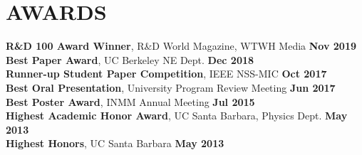 \section{\small{AWARDS}}

\textbf{R\&D 100 Award Winner}, R\&D World Magazine, WTWH Media \hfill \textbf{Nov 2019}\\
\textbf{Best Paper Award}, UC Berkeley NE Dept. \hfill \textbf{Dec 2018}\\
\textbf{Runner-up Student Paper Competition}, IEEE NSS-MIC \hfill \textbf{Oct 2017}\\
\textbf{Best Oral Presentation}, University Program Review Meeting \hfill \textbf{Jun 2017}\\
\textbf{Best Poster Award}, INMM Annual Meeting \hfill \textbf{Jul 2015}\\
\textbf{Highest Academic Honor Award}, UC Santa Barbara, Physics Dept. \hfill \textbf{May 2013}\\
\textbf{Highest Honors}, UC Santa Barbara \hfill \textbf{May 2013}\\[-2.8ex]
